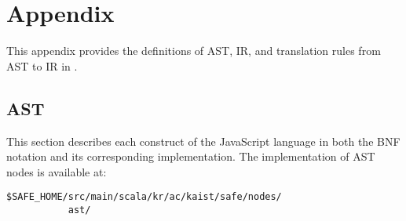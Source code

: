 \appendix

\chapter{Appendix}

This appendix provides the definitions of
AST, IR, and translation rules from AST to IR in \safe.

\section{AST}
This section describes each construct of the JavaScript language
in both the BNF notation and its corresponding implementation.
The implementation of AST nodes is available at:
\begin{verbatim}
$SAFE_HOME/src/main/scala/kr/ac/kaist/safe/nodes/
           ast/
\end{verbatim}
\small
